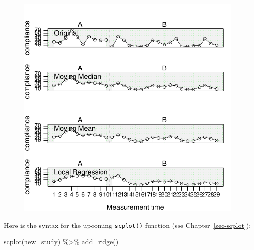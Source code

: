 \documentclass[
  letterpaper,
  DIV=11,
  numbers=noendperiod]{scrreprt}
\newenvironment{Shaded}{\begin{snugshade}}{\end{snugshade}}
\newcommand{\FunctionTok}[1]{\textcolor[rgb]{0.28,0.35,0.67}{#1}}
\newcommand{\NormalTok}[1]{\textcolor[rgb]{0.00,0.23,0.31}{#1}}
\newcommand{\SpecialCharTok}[1]{\textcolor[rgb]{0.37,0.37,0.37}{#1}}
\begin{document}
\begin{figure}[H]

{\centering \includegraphics{./app_supseded_functions_files/figure-pdf/smooth_example-1.pdf}

}

\end{figure}

Here is the syntax for the upcoming \texttt{scplot()} function (see
Chapter~\ref{sec-scplot}):

\begin{Shaded}
\begin{Highlighting}[]
\FunctionTok{scplot}\NormalTok{(new\_study) }\SpecialCharTok{\%\textgreater{}\%} \FunctionTok{add\_ridge}\NormalTok{()}
\end{Highlighting}
\end{Shaded}
\end{document}
